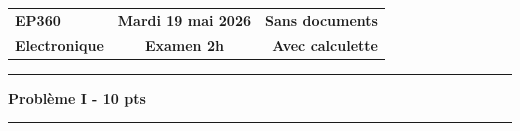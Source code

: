 \documentclass[11pt, a4paper]{article}
\begin{document}
\noindent
\begin{tabularx}{\textwidth}{@{}X c r@{}}
\textbf{EP360} & \textbf{Mardi 19 mai 2026} & \textbf{Sans documents} \\
\textbf{Electronique} & \textbf{Examen 2h} & \textbf{Avec calculette} \\
\end{tabularx}
\vspace{0.2cm}
\hrule
\vspace{0.4cm}

\begin{center}
    \textbf{\Large Problème I - 10 pts}
\end{center}
\vspace{-0.2cm}
\hrule
\vspace{0.3cm}
\end{document}
